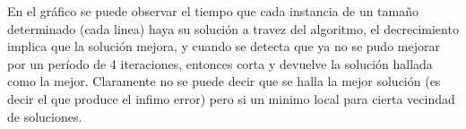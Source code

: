   En el gráfico se puede observar el tiempo que cada instancia de un tamaño determinado (cada linea) haya su solución a travez del algoritmo, el decrecimiento implica que la solución mejora, y cuando se detecta que ya no se pudo mejorar por un período de 4 iteraciones, entonces corta y devuelve la solución hallada como la mejor. Claramente no se puede decir que se halla la mejor solución (es decir el que produce el infimo error) pero si un minimo local para cierta vecindad de soluciones.

